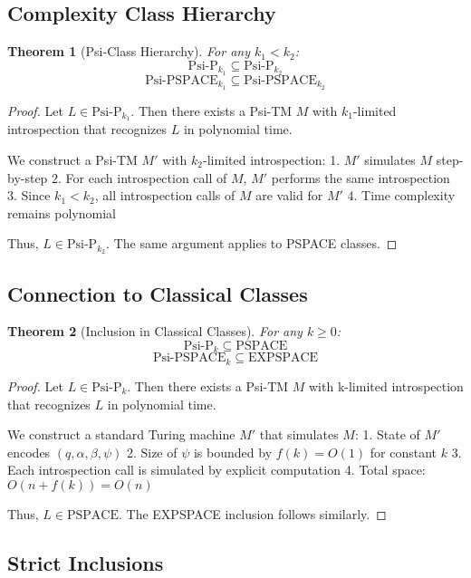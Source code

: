 \documentclass[11pt]{article}
\newtheorem{theorem}{Theorem}
\begin{document}
\subsection{Complexity Class Hierarchy}

\begin{theorem}[Psi-Class Hierarchy]
For any $k_1 < k_2$:
$$\text{Psi-P}_{k_1} \subseteq \text{Psi-P}_{k_2}$$
$$\text{Psi-PSPACE}_{k_1} \subseteq \text{Psi-PSPACE}_{k_2}$$
\end{theorem}

\begin{proof}
Let $L \in \text{Psi-P}_{k_1}$. Then there exists a Psi-TM $M$ with $k_1$-limited introspection that recognizes $L$ in polynomial time.

We construct a Psi-TM $M'$ with $k_2$-limited introspection:
1. $M'$ simulates $M$ step-by-step
2. For each introspection call of $M$, $M'$ performs the same introspection
3. Since $k_1 < k_2$, all introspection calls of $M$ are valid for $M'$
4. Time complexity remains polynomial

Thus, $L \in \text{Psi-P}_{k_2}$. The same argument applies to PSPACE classes.
\end{proof}

\subsection{Connection to Classical Classes}

\begin{theorem}[Inclusion in Classical Classes]
For any $k \geq 0$:
$$\text{Psi-P}_k \subseteq \text{PSPACE}$$
$$\text{Psi-PSPACE}_k \subseteq \text{EXPSPACE}$$
\end{theorem}

\begin{proof}
Let $L \in \text{Psi-P}_k$. Then there exists a Psi-TM $M$ with k-limited introspection that recognizes $L$ in polynomial time.

We construct a standard Turing machine $M'$ that simulates $M$:
1. State of $M'$ encodes $(q, \alpha, \beta, \psi)$
2. Size of $\psi$ is bounded by $f(k) = O(1)$ for constant $k$
3. Each introspection call is simulated by explicit computation
4. Total space: $O(n + f(k)) = O(n)$

Thus, $L \in \text{PSPACE}$. The EXPSPACE inclusion follows similarly.
\end{proof}

\subsection{Strict Inclusions}
\end{document}
